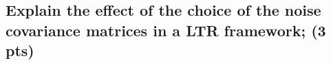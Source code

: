 \subsection{Explain the effect of the choice of the noise covariance matrices in a LTR framework; (3 pts)}
\vspace{10pt}

